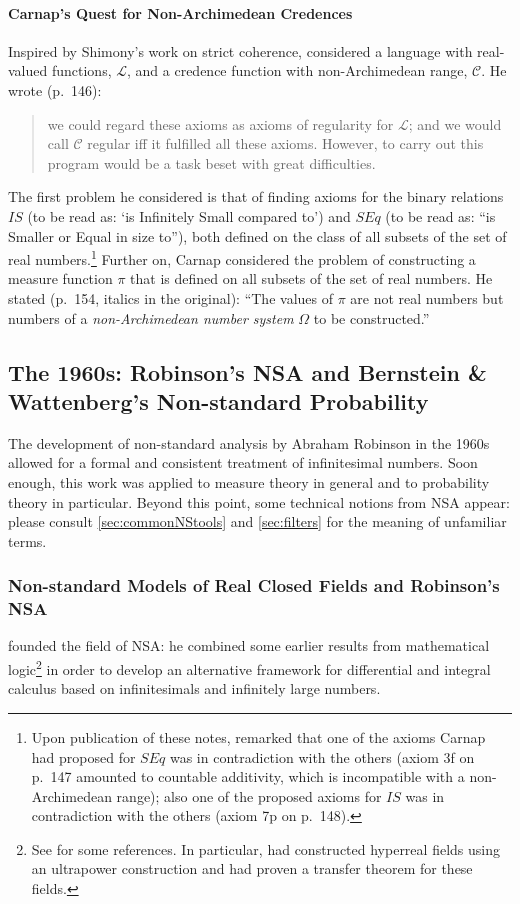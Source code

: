 \paragraph{Carnap's Quest for Non-Archimedean Credences}
Inspired by Shimony's work on strict coherence, \citet{Carnap:1980} considered a language with real-valued functions, $\mathcal{L}$, and a credence function with non-Archimedean range, $\mathcal{C}$. He wrote (p.~146):
\begin{quote}
we could regard these axioms as axioms of regularity for $\mathcal{L}$; and we would call $\mathcal{C}$ regular iff it fulfilled all these axioms. However, to carry out this program would be a task beset with great difficulties.
\end{quote}
The first problem he considered is that of finding axioms for the binary relations $IS$ (to be read as: `is Infinitely Small compared to') and $SEq$ (to be read as: ``is Smaller or Equal in size to''), both defined on the class of all subsets of the set of real numbers.\footnote{Upon publication of these notes, \citet{Hoover:1980} remarked that one of the axioms Carnap had proposed for $SEq$ was in contradiction with the others (axiom 3f on p.~147 amounted to countable additivity, which is incompatible with a non-Archimedean range); also one of the proposed axioms for $IS$ was in contradiction with the others (axiom 7p on p.~148).} Further on, Carnap considered the problem of constructing a measure function $\pi$ that is defined on all subsets of the set of real numbers. He stated (p.~154, italics in the original):
``The values of $\pi$ are not real numbers but numbers of a \emph{non-Archimedean number system} $\Omega$ to be constructed.''

\subsection{The 1960s: Robinson's NSA and Bernstein \& Wattenberg's Non-standard Probability}
The development of non-standard analysis by Abraham Robinson in the 1960s allowed for a formal and consistent treatment of infinitesimal numbers. Soon enough, this work was applied to measure theory in general and to probability theory in particular. Beyond this point, some technical notions from NSA appear: please consult \autoref{sec:commonNStools} and \autoref{sec:filters} for the meaning of unfamiliar terms.

\subsubsection*{Non-standard Models of Real Closed Fields and Robinson's NSA}\label{sec:RCFs}
\citet{Robinson:1961,Robinson:1966} founded the field of NSA: he combined some earlier results from mathematical logic\footnote{See \citet[p.~48]{Robinson:1966} for some references. In particular, \citet{Hewitt:1948} had constructed hyperreal fields using an ultrapower construction and \citet{Los:1955} had proven a transfer theorem for these fields.} in order to develop an alternative framework for differential and integral calculus based on infinitesimals and infinitely large numbers.

